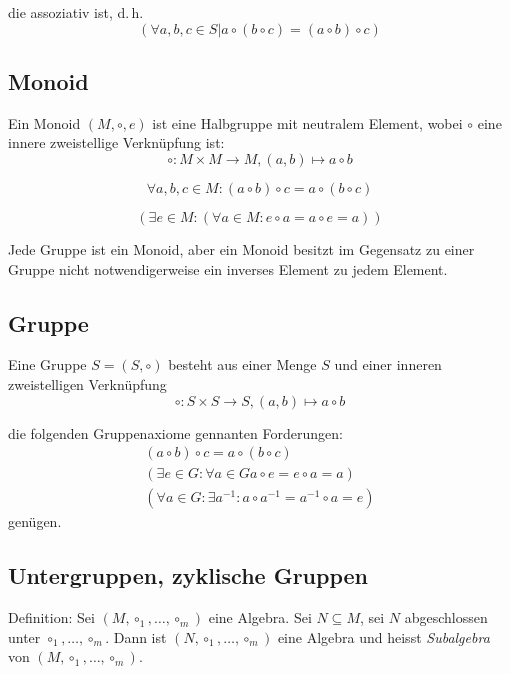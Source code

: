 \documentclass[a4paper, ngerman, landscape, fleqn]{article}
\begin{document}
\begin{multicols*}{3}
die assoziativ ist, d.\,h.
\begin{equation*}
    (\forall a, b, c \in S | a \circ (b \circ c) = (a \circ b) \circ c)
\end{equation*}

\subsection*{Monoid}

Ein Monoid $(M, \circ, e)$ ist eine Halbgruppe mit neutralem Element, wobei $\circ$ eine innere zweistellige Verknüpfung ist:
\begin{equation*}
    \circ : M \times M \rightarrow M, (a, b) \mapsto a \circ b
\end{equation*}

\begin{equation*}
    \forall a, b, c \in M : (a \circ b) \circ c = a \circ (b \circ c)
\end{equation*}

\begin{equation*}
    (\exists e \in M : (\forall a \in M : e \circ a = a \circ e = a))
\end{equation*}

Jede Gruppe ist ein Monoid, aber ein Monoid besitzt im Gegensatz zu einer Gruppe nicht notwendigerweise ein inverses Element zu jedem Element.

\subsection*{Gruppe}
Eine Gruppe $S = (S, \circ)$ besteht aus einer Menge $S$ und einer inneren zweistelligen Verknüpfung
\begin{equation*}
    \circ : S \times S \rightarrow S, (a, b) \mapsto a \circ b
\end{equation*}

die folgenden Gruppenaxiome gennanten Forderungen:
\begin{align*}
    (a \circ b) \circ c = a \circ (b \circ c) \\
    (\exists e \in G : \forall a \in G a \circ e = e \circ a = a) \\
    (\forall a \in G : \exists a^{-1} : a \circ a^{-1} = a^{-1} \circ a = e)
\end{align*}
genügen.

\subsection*{Untergruppen, zyklische Gruppen}
Definition: Sei $(M, \circ_1, \dotsc, \circ_m)$ eine Algebra. Sei $N \subseteq M$, sei $N$ abgeschlossen unter $\circ_1, \dotsc, \circ_m$. Dann ist $(N, \circ_1, \dotsc, \circ_m)$ eine Algebra und heisst \emph{Subalgebra} von $(M, \circ_1, \dotsc, \circ_m)$.


\end{multicols*}
\end{document}
